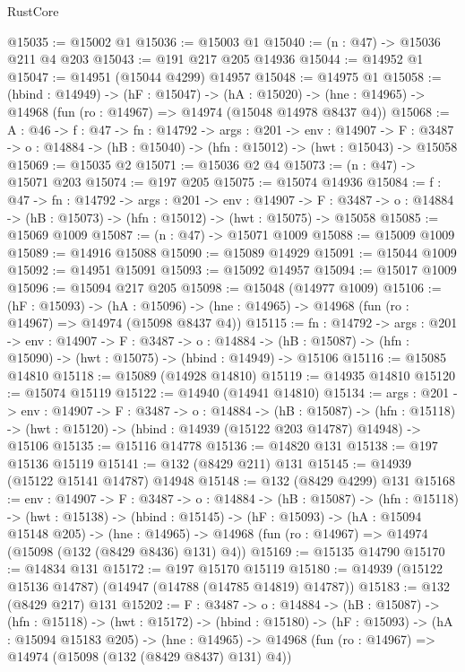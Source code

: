 \begin{lexlean}{RustCore}
\begin{coremodule}
@15035 := @15002 @1
@15036 := @15003 @1
@15040 := (n : @47) -> @15036 @211 @4 @203
@15043 := @191 @217 @205 @14936
@15044 := @14952 @1
@15047 := @14951 (@15044 @4299) @14957
@15048 := @14975 @1
@15058 := (hbind : @14949) ->
  (hF : @15047) ->
  (hA : @15020) -> (hne : @14965) -> @14968 (fun (ro : @14967) => @14974 (@15048 @14978 @8437 @4))
@15068 := {A : @46} ->
  {f : @47} ->
  {fn : @14792} ->
  {args : @201} ->
  {env : @14907} ->
  {F : @3487} -> {o : @14884} -> (hB : @15040) -> (hfn : @15012) -> (hwt : @15043) -> @15058
@15069 := @15035 @2
@15071 := @15036 @2 @4
@15073 := (n : @47) -> @15071 @203
@15074 := @197 @205
@15075 := @15074 @14936
@15084 := {f : @47} ->
  {fn : @14792} ->
  {args : @201} ->
  {env : @14907} ->
  {F : @3487} -> {o : @14884} -> (hB : @15073) -> (hfn : @15012) -> (hwt : @15075) -> @15058
@15085 := @15069 @1009
@15087 := (n : @47) -> @15071 @1009
@15088 := @15009 @1009
@15089 := @14916 @15088
@15090 := @15089 @14929
@15091 := @15044 @1009
@15092 := @14951 @15091
@15093 := @15092 @14957
@15094 := @15017 @1009
@15096 := @15094 @217 @205
@15098 := @15048 (@14977 @1009)
@15106 := (hF : @15093) ->
  (hA : @15096) -> (hne : @14965) -> @14968 (fun (ro : @14967) => @14974 (@15098 @8437 @4))
@15115 := {fn : @14792} ->
  {args : @201} ->
  {env : @14907} ->
  {F : @3487} ->
  {o : @14884} -> (hB : @15087) -> (hfn : @15090) -> (hwt : @15075) -> (hbind : @14949) -> @15106
@15116 := @15085 @14810
@15118 := @15089 (@14928 @14810)
@15119 := @14935 @14810
@15120 := @15074 @15119
@15122 := @14940 (@14941 @14810)
@15134 := {args : @201} ->
  {env : @14907} ->
  {F : @3487} ->
  {o : @14884} ->
  (hB : @15087) ->
  (hfn : @15118) -> (hwt : @15120) -> (hbind : @14939 (@15122 @203 @14787) @14948) -> @15106
@15135 := @15116 @14778
@15136 := @14820 @131
@15138 := @197 @15136 @15119
@15141 := @132 (@8429 @211) @131
@15145 := @14939 (@15122 @15141 @14787) @14948
@15148 := @132 (@8429 @4299) @131
@15168 := {env : @14907} ->
  {F : @3487} ->
  {o : @14884} ->
  (hB : @15087) ->
  (hfn : @15118) ->
  (hwt : @15138) ->
  (hbind : @15145) ->
  (hF : @15093) ->
  (hA : @15094 @15148 @205) ->
  (hne : @14965) -> @14968 (fun (ro : @14967) => @14974 (@15098 (@132 (@8429 @8436) @131) @4))
@15169 := @15135 @14790
@15170 := @14834 @131
@15172 := @197 @15170 @15119
@15180 := @14939 (@15122 @15136 @14787) (@14947 (@14788 (@14785 @14819) @14787))
@15183 := @132 (@8429 @217) @131
@15202 := {F : @3487} ->
  {o : @14884} ->
  (hB : @15087) ->
  (hfn : @15118) ->
  (hwt : @15172) ->
  (hbind : @15180) ->
  (hF : @15093) ->
  (hA : @15094 @15183 @205) ->
  (hne : @14965) -> @14968 (fun (ro : @14967) => @14974 (@15098 (@132 (@8429 @8437) @131) @4))

\end{coremodule}
\end{lexlean}
